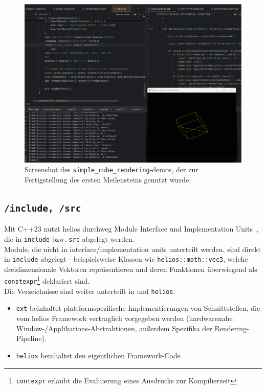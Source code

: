 \begin{figure}[!h]
    \centering
    \includegraphics[width=1\columnwidth]{img/cube_example}
    \caption{Screenshot des \texttt{simple\_cube\_rendering}-demos, der zur Fertigstellung des ersten Meilensteins genutzt wurde.}
    \label{fig:simple-cube-rendering-demo}
\end{figure}

\subsection*{\texttt{/include, /src}}
Mit C++23 nutzt helios durchweg Module Interface und Implementation Units~\cite[211 f-]{Str24}, die in \texttt{include} bzw. \texttt{src} abgelegt werden.\\
Module, die nicht in interface/implementation units unterteilt werden, sind direkt in \texttt{include} abgelegt - beispielsweise Klassen wie \texttt{helios::math::vec3}, welche dreidimensionale Vektoren repräsentieren und deren Funktionen überwiegend als \texttt{constexpr}\footnote{
\texttt{contexpr} erlaubt die Evaluierung eines Ausdrucks zur Kompilierzeit
} deklariert sind.\\
Die Verzeichnisse sind weiter unterteilt in  und \texttt{helios}:
\begin{itemize}
    \itemsep0.5em
    \item \texttt{ext} beinhaltet plattformspezifische Implementierungen von Schnittstellen, die vom helios Framework vertraglich vorgegeben werden (hardwarenahe Window-/Applikations-Abstraktionen, außerdem Spezifika der Rendering-Pipeline).
    \item \texttt{helios} beinhaltet den eigentlichen Framework-Code
\end{itemize}